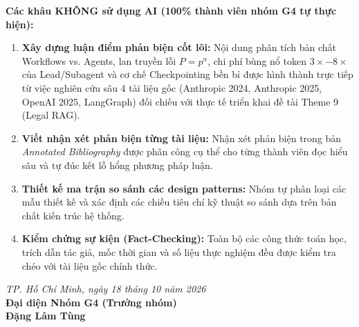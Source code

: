 \documentclass[11pt,a4paper]{article}
\begin{document}
\vspace{0.3cm}
\noindent \textbf{\large Các khâu KHÔNG sử dụng AI (100\% thành viên nhóm G4 tự thực hiện):}
\begin{enumerate}
  \item \textbf{Xây dựng luận điểm phản biện cốt lõi:} Nội dung phân tích bản chất Workflows vs. Agents, lan truyền lỗi $P=p^n$, chi phí bùng nổ token $3\times-8\times$ của Lead/Subagent và cơ chế Checkpointing bền bỉ được hình thành trực tiếp từ việc nghiên cứu sâu 4 tài liệu gốc (Anthropic 2024, Anthropic 2025, OpenAI 2025, LangGraph) đối chiếu với thực tế triển khai đề tài Theme 9 (Legal RAG).
  \item \textbf{Viết nhận xét phản biện từng tài liệu:} Nhận xét phản biện trong bản \textit{Annotated Bibliography} được phân công cụ thể cho từng thành viên đọc hiểu sâu và tự đúc kết lỗ hổng phương pháp luận.
  \item \textbf{Thiết kế ma trận so sánh các design patterns:} Nhóm tự phân loại các mẫu thiết kế và xác định các chiều tiêu chí kỹ thuật so sánh dựa trên bản chất kiến trúc hệ thống.
  \item \textbf{Kiểm chứng sự kiện (Fact-Checking):} Toàn bộ các công thức toán học, trích dẫn tác giả, mốc thời gian và số liệu thực nghiệm đều được kiểm tra chéo với tài liệu gốc chính thức.
\end{enumerate}

\vspace{0.8cm}
\begin{flushright}
  \textit{TP. Hồ Chí Minh, ngày 18 tháng 10 năm 2026}\\[0.2cm]
  \textbf{Đại diện Nhóm G4 (Trưởng nhóm)}\\[1.5cm]
  \textbf{Đặng Lâm Tùng}
\end{flushright}
\end{document}
